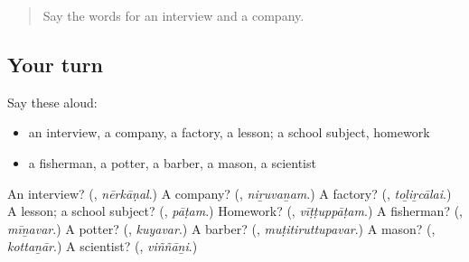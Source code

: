 \begin{quote}
Say the words for an interview and a company.
\end{quote}

\subsection*{Your turn}
Say these aloud:

\begin{itemize}
\raggedright
  \item an interview, a company, a factory, a lesson; a school subject, homework
  \item a fisherman, a potter, a barber, a mason, a scientist
\end{itemize}

\begin{tcolorbox}[breakable,colback=teal!4,colframe=teal!35!black,title={Before you move on}]
An interview? (\textbf{}, \emph{nērkāṇal}.) A company? (\textbf{}, \emph{niṟuvaṉam}.) A factory? (\textbf{}, \emph{toḻiṟcālai}.) A lesson; a school subject? (\textbf{}, \emph{pāṭam}.) Homework? (\textbf{}, \emph{vīṭṭuppāṭam}.) A fisherman? (\textbf{}, \emph{mīṉavar}.) A potter? (\textbf{}, \emph{kuyavar}.) A barber? (\textbf{}, \emph{muṭitiruttupavar}.) A mason? (\textbf{}, \emph{kottaṉār}.) A scientist? (\textbf{}, \emph{viññāṉi}.)
\end{tcolorbox}
